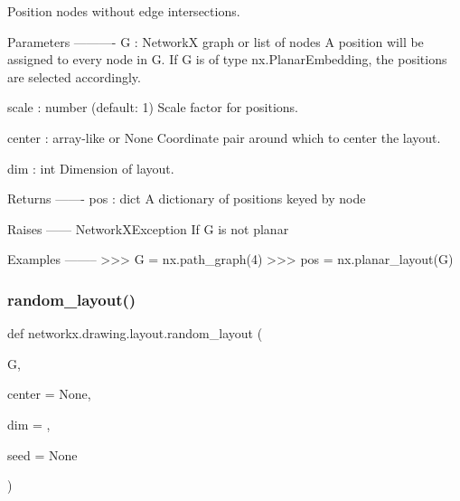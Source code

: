 \begin{DoxyVerb}Position nodes without edge intersections.

Parameters
----------
G : NetworkX graph or list of nodes
    A position will be assigned to every node in G. If G is of type
    nx.PlanarEmbedding, the positions are selected accordingly.

scale : number (default: 1)
    Scale factor for positions.

center : array-like or None
    Coordinate pair around which to center the layout.

dim : int
    Dimension of layout.

Returns
-------
pos : dict
    A dictionary of positions keyed by node

Raises
------
NetworkXException
    If G is not planar

Examples
--------
>>> G = nx.path_graph(4)
>>> pos = nx.planar_layout(G)
\end{DoxyVerb}
 \mbox{\label{namespacenetworkx_1_1drawing_1_1layout_addafb2807d9e7cb9a5f464ce70bc2e1b}} 
\subsubsection{\texorpdfstring{random\+\_\+layout()}{random\_layout()}}
{\footnotesize\ttfamily def networkx.\+drawing.\+layout.\+random\+\_\+layout (\begin{DoxyParamCaption}\item[{}]{G,  }\item[{}]{center = {\ttfamily None},  }\item[{}]{dim = {},  }\item[{}]{seed = {\ttfamily None} }\end{DoxyParamCaption})}

